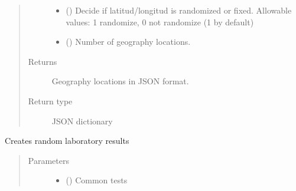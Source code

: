 \documentclass[letterpaper,10pt,english]{sphinxmanual}
\begin{document}
\begin{fulllineitems}
\begin{fulllineitems}
\begin{quote}
\begin{description}
\begin{itemize}
\item {} 
\sphinxAtStartPar
{} () \textendash{} Decide if latitud/longitud is randomized or fixed. Allowable values: 1 randomize, 0 not randomize (1 by default)

\item {} 
\sphinxAtStartPar
{} () \textendash{} Number of geography locations.

\end{itemize}

\item[{Returns}] \leavevmode
\sphinxAtStartPar
Geography locations in JSON format.

\item[{Return type}] \leavevmode
\sphinxAtStartPar
JSON dictionary

\end{description}\end{quote}

\end{fulllineitems}


\begin{fulllineitems}
\label{\detokenize{CE_app.synth_phr:CE_app.synth_phr.functions.Domains.lab_result}}
\sphinxAtStartPar
Creates random laboratory results
\begin{quote}\begin{description}
\item[{Parameters}] \leavevmode\begin{itemize}
\item {} 
\sphinxAtStartPar
{} () \textendash{} Common tests


\end{itemize}
\end{description}
\end{quote}
\end{fulllineitems}
\end{fulllineitems}
\end{document}
